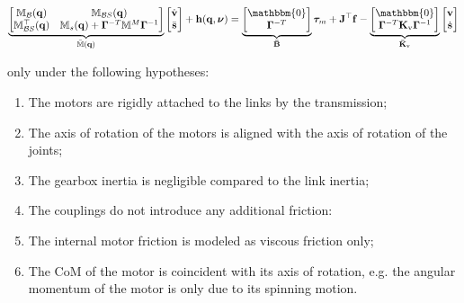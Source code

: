\begin{equation}
    \underbrace{\begin{bmatrix}
            \mathbb{M} _{\mathcal{B}}(\mathbf{q})        & \mathbb{M} _{\mathcal{B}S}(\mathbf{q})                                                      \\
            \mathbb{M} _{\mathcal{B}S} ^\top(\mathbf{q}) & \mathbb{M} _s(\mathbf{q}) + \boldsymbol{\Gamma} ^{-T}\mathbb{M} ^M\boldsymbol{\Gamma} ^{-1}
        \end{bmatrix}} _{\bar{\mathbb{M}}(\mathbf{q})}
    \begin{bmatrix}
        \dot{\mathbf{v}}\\
        \ddot{\mathbf{s}}
    \end{bmatrix}+
    \mathbf{h}
    (\mathbf{q},\boldsymbol{\nu}) =
    \underbrace{\begin{bmatrix}
            \mathbbm{0} \\
            \boldsymbol{\Gamma} ^{-T}
        \end{bmatrix}} _{\mathbf{\bar{B}}}
    \boldsymbol{\tau} _m
    +
    \mathbf{J} ^\top
    \mathbf{f}
    -
    \underbrace{\begin{bmatrix}
            \mathbbm{0} \\
            \boldsymbol{\Gamma} ^{-T}\mathbf{K} _{\mathrm{v}}\boldsymbol{\Gamma} ^{-1}
        \end{bmatrix}} _{\mathbf{\bar{K}}_{\mathrm{v}}}
    \begin{bmatrix}
        \mathbf{v} \\
        \dot{\mathbf{s}}
    \end{bmatrix}
\end{equation}

only under the following hypotheses:

\begin{enumerate}
    \item The motors are rigidly attached to the links by the transmission;
    \item The axis of rotation of the motors is aligned with the axis of rotation of the joints;
    \item The gearbox inertia is negligible compared to the link inertia;
    \item The couplings do not introduce any additional friction:
    \item The internal motor friction is modeled as viscous friction only;
    \item The \ac{CoM} of the motor is coincident with its axis of rotation, e.g. the angular momentum of the motor is only due to its spinning motion.
\end{enumerate}

